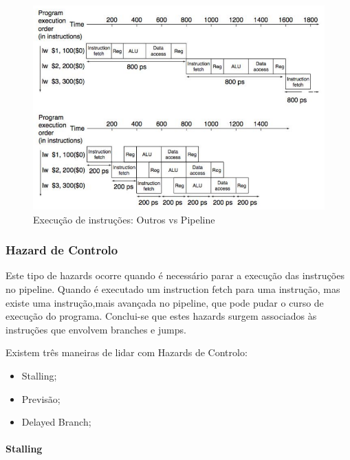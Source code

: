 \documentclass[10pt,a4paper]{book}
\begin{document}
			\begin{figure}[htp]
					\centering
					\includegraphics[scale=0.4]{pipeline1.png}
					\caption{Execução de instruções: Outros vs Pipeline}
					\label{Others vs Pipeline}
			\end{figure}

	  \subsubsection{Hazard de Controlo}

			Este tipo de hazards ocorre quando é necessário parar a execução das instruções no pipeline.
			Quando é executado um instruction fetch para uma instrução, mas existe uma instrução,mais avançada no pipeline, que pode pudar o curso de execução do programa.
			Conclui-se que estes hazards surgem associados às instruções que envolvem branches e jumps.

			Existem três maneiras de lidar com Hazards de Controlo:

			\begin{itemize}
				\item Stalling;
				\item Previsão;
				\item Delayed Branch;
			\end{itemize}

			\paragraph{Stalling}
\end{document}
